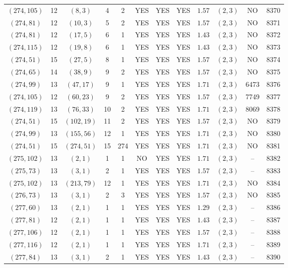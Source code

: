 \begin{longtable}{|c|c|c|c|c|c|c|c|c|c|c|c|}
$(274,105)$ & 12 & $(8,3)$ & 4 & 2 & YES & YES & YES & $1.57$ & $(2,3)$ & NO & 8370\\
$(274,81)$ & 12 & $(10,3)$ & 5 & 2 & YES & YES & YES & $1.57$ & $(2,3)$ & NO & 8371\\
$(274,81)$ & 12 & $(17,5)$ & 6 & 1 & YES & YES & YES & $1.43$ & $(2,3)$ & NO & 8372\\
$(274,115)$ & 12 & $(19,8)$ & 6 & 1 & YES & YES & YES & $1.43$ & $(2,3)$ & NO & 8373\\
$(274,51)$ & 15 & $(27,5)$ & 8 & 1 & YES & YES & YES & $1.57$ & $(2,3)$ & NO & 8374\\
$(274,65)$ & 14 & $(38,9)$ & 9 & 2 & YES & YES & YES & $1.57$ & $(2,3)$ & NO & 8375\\
$(274,99)$ & 13 & $(47,17)$ & 9 & 1 & YES & YES & YES & $1.71$ & $(2,3)$ & 6473 & 8376\\
$(274,105)$ & 12 & $(60,23)$ & 9 & 2 & YES & YES & YES & $1.57$ & $(2,3)$ & 7749 & 8377\\
$(274,119)$ & 13 & $(76,33)$ & 10 & 2 & YES & YES & YES & $1.71$ & $(2,3)$ & 8069 & 8378\\
$(274,51)$ & 15 & $(102,19)$ & 11 & 2 & YES & YES & YES & $1.57$ & $(2,3)$ & NO & 8379\\
$(274,99)$ & 13 & $(155,56)$ & 12 & 1 & YES & YES & YES & $1.71$ & $(2,3)$ & NO & 8380\\
$(274,51)$ & 15 & $(274,51)$ & 15 & 274 & YES & YES & YES & $1.71$ & $(2,3)$ & NO & 8381\\
$(275,102)$ & 13 & $(2,1)$ & 1 & 1 & NO & YES & YES & $1.71$ & $(2,3)$ & -- & 8382\\
$(275,73)$ & 13 & $(3,1)$ & 2 & 1 & YES & YES & YES & $1.57$ & $(2,3)$ & -- & 8383\\
$(275,102)$ & 13 & $(213,79)$ & 12 & 1 & YES & YES & YES & $1.71$ & $(2,3)$ & NO & 8384\\
$(276,73)$ & 13 & $(3,1)$ & 2 & 3 & YES & YES & YES & $1.57$ & $(2,3)$ & NO & 8385\\
$(277,60)$ & 13 & $(2,1)$ & 1 & 1 & YES & YES & YES & $1.29$ & $(2,3)$ & -- & 8386\\
$(277,81)$ & 12 & $(2,1)$ & 1 & 1 & YES & YES & YES & $1.43$ & $(2,3)$ & -- & 8387\\
$(277,106)$ & 12 & $(2,1)$ & 1 & 1 & YES & YES & YES & $1.57$ & $(2,3)$ & -- & 8388\\
$(277,116)$ & 12 & $(2,1)$ & 1 & 1 & YES & YES & YES & $1.71$ & $(2,3)$ & -- & 8389\\
$(277,84)$ & 13 & $(3,1)$ & 2 & 1 & YES & YES & YES & $1.43$ & $(2,3)$ & -- & 8390\\

\end{longtable}
